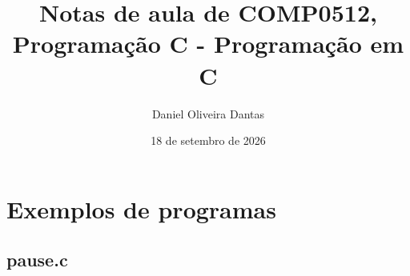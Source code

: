 \documentclass{book}
\title{Notas de aula de COMP0512, Programação C - Programação em C}
\author{Daniel Oliveira Dantas}
\date{18 de setembro de 2026}
\begin{document}
\maketitle


\tableofcontents
\pagestyle{plain}





























\chapter{Exemplos de programas}



\section{pause.c}
\end{document}
